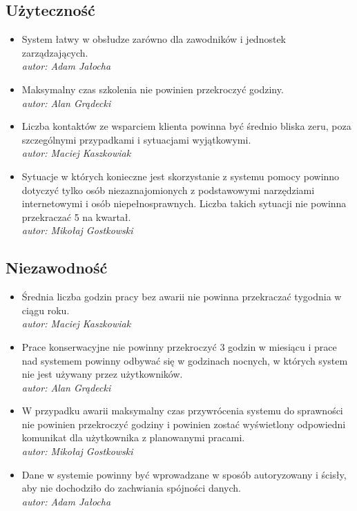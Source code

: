 \documentclass[polish, a4paper]{article}
\begin{document}
\subsection{Użyteczność}
\begin{itemize}

\item System łatwy w obsłudze zarówno dla zawodników i jednostek zarządzających.\\ \emph{autor: Adam Jałocha}

\item Maksymalny czas szkolenia nie powinien przekroczyć godziny. \\ \emph{autor: Alan Grądecki}
  
\item Liczba kontaktów ze wsparciem klienta powinna być średnio bliska zeru, poza szczególnymi przypadkami i sytuacjami wyjątkowymi.\\ \emph{autor: Maciej Kaszkowiak}
  
\item Sytuacje w których konieczne jest skorzystanie z systemu pomocy powinno dotyczyć tylko osób niezaznajomionych z podstawowymi narzędziami internetowymi i osób niepełnosprawnych. Liczba takich sytuacji nie powinna przekraczać 5 na kwartał.\\ \emph{autor: Mikołaj Gostkowski}

\end{itemize}

\subsection{Niezawodność}
\begin{itemize}

\item Średnia liczba godzin pracy bez awarii nie powinna przekraczać tygodnia w ciągu roku. \\ \emph{autor: Maciej Kaszkowiak}
  
\item Prace konserwacyjne nie powinny przekroczyć 3 godzin w miesiącu i prace nad systemem 
powinny odbywać się w godzinach nocnych, w których system nie jest używany przez użytkowników. \\ \emph{autor: Alan Grądecki}
  
\item W przypadku awarii maksymalny czas przywrócenia systemu do sprawności nie powinien przekroczyć godziny i powinien zostać wyświetlony odpowiedni komunikat dla użytkownika z planowanymi pracami.\\ \emph{autor: Mikołaj Gostkowski}

\item Dane w systemie powinny być wprowadzane w sposób autoryzowany i ścisły, aby nie dochodziło do zachwiania spójności danych.  \\ \emph{autor: Adam Jałocha}

\end{itemize}
\end{document}
